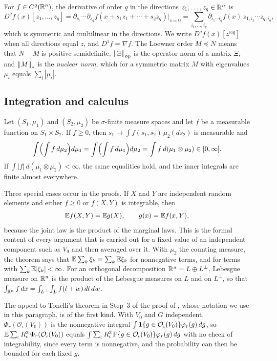 For \(f\in C^q(\mathbb R^n)\), the derivative of order \(q\) in the directions
\(z_1,\ldots,z_q\in\mathbb R^n\) is
\[
 D^qf(x)[z_1,\ldots,z_q]
 =\partial_{s_1}\cdots\partial_{s_q}f(x+s_1z_1+\cdots+s_qz_q)\Big|_{s=0}
 =\sum_{i_1,\ldots,i_q}\partial_{i_1\cdots i_q}f(x)\,
   z_{1,i_1}\cdots z_{q,i_q},
\]
which is symmetric and multilinear in the directions. We write
\(D^qf(x)[z^{\otimes q}]\) when all directions equal \(z\), and
\(D^1f=\nabla f\). The Loewner order \(M\preceq N\) means that
\(N-M\) is positive semidefinite, \(\left\lVert\Xi\right\rVert_{\mathrm{op}}\) is the operator norm
of a matrix \(\Xi\), and \(\left\lVert M\right\rVert_*\) is the \emph{nuclear norm}, which for
a symmetric matrix \(M\) with eigenvalues \(\mu_i\) equals \(\sum_i|\mu_i|\).

\subsection{Integration and calculus}\label{tb:sec:calc}

\begin{fact}\label{tb:fubini}
Let \((S_1,\mu_1)\) and \((S_2,\mu_2)\) be \(\sigma\)-finite measure
spaces and let \(f\) be a measurable function on \(S_1\times S_2\). If
\(f\ge0\), then \(s_1\mapsto\int f(s_1,s_2)\,\mu_2(ds_2)\) is measurable
and
\[
 \int\Bigl(\int f\,d\mu_2\Bigr)d\mu_1
 =\int\Bigl(\int f\,d\mu_1\Bigr)d\mu_2
 =\int f\,d(\mu_1\otimes\mu_2)\in[0,\infty].
\]
If \(\int|f|\,d(\mu_1\otimes\mu_2)<\infty\), the same equalities hold, and
the inner integrals are finite almost everywhere.
\end{fact}

Three special cases occur in the proofs. If \(X\) and \(Y\) are
independent random elements and either \(f\ge0\) or \(f(X,Y)\) is
integrable, then
\[
 \mathbb E f(X,Y)=\mathbb E g(X),\qquad g(x)=\mathbb E f(x,Y),
\]
because the joint law is the product of the marginal laws. This is the
formal content of every argument that is carried out for a fixed value of
an independent component such as \(V_0\) and then averaged over it. With
\(\mu_2\) the counting measure, the theorem says that
\(\mathbb E\sum_k\xi_k=\sum_k\mathbb E\xi_k\) for nonnegative terms, and for terms with
\(\sum_k\mathbb E|\xi_k|<\infty\). For an orthogonal decomposition
\(\mathbb R^n=L\oplus L^\perp\), Lebesgue measure on \(\mathbb R^n\) is the product of the
Lebesgue measures on \(L\) and on \(L^\perp\), so that
\(\int_{\mathbb R^n}f\,dx=\int_{L^\perp}\int_Lf(l+w)\,dl\,dw\).

The appeal to Tonelli's theorem in Step~3 of the proof of
, whose notation we use in this
paragraph, is of the first kind. With \(V_0\) and
\(G\) independent, \(\Phi_r(\mathcal O_\iota(V_0))\) is the nonnegative
integral \(\int\mathbf 1\{g\in\mathcal O_\iota(V_0)\}\varphi_r(g)\,dg\), so
\(\mathbb E\sum_\iota R_\iota^3\,\Phi_r(\mathcal O_\iota(V_0))\) equals
\(\int\sum_\iota R_\iota^3\,\mathbb P\{g\in\mathcal O_\iota(V_0)\}\varphi_r(g)\,dg\)
with no check of integrability, since every term is nonnegative, and the
probability can then be bounded for each fixed \(g\).


